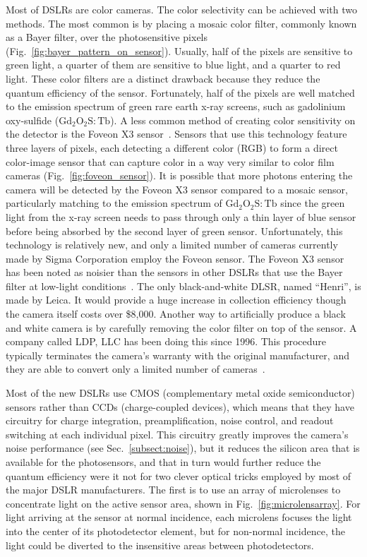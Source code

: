 Most of DSLRs are color cameras.  The color selectivity can be achieved with two methods.  The most common is by placing a mosaic color filter, commonly known as a Bayer filter, over the photosensitive pixels (Fig.~\ref{fig:bayer_pattern_on_sensor}).  Usually, half of the pixels are sensitive to green light, a quarter of them are sensitive to blue light, and a quarter to red light.  These color filters are a distinct drawback because they reduce the quantum efficiency of the sensor.  Fortunately, half of the pixels are well matched to the emission spectrum of green rare earth x-ray screens, such as gadolinium oxy-sulfide ($\mathrm{Gd_2O_2S:Tb}$).  A less common method of creating color sensitivity on the detector is the Foveon X3 sensor~\citep{foveon}.  Sensors that use this technology feature three layers of pixels, each detecting a different color (RGB) to form a direct color-image sensor that can capture color in a way very similar to color film cameras (Fig.~\ref{fig:foveon_sensor}).  It is possible that more photons entering the camera will be detected by the Foveon X3 sensor compared to a mosaic sensor, particularly matching to the emission spectrum of $\mathrm{Gd_2O_2S:Tb}$ since the green light from the x-ray screen needs to pass through only a thin layer of blue sensor before being absorbed by the second layer of green sensor.  Unfortunately, this technology is relatively new, and only a limited number of cameras currently made by Sigma Corporation employ the Foveon sensor.  The Foveon X3 sensor has been noted as noisier than the sensors in other DSLRs that use the Bayer filter at low-light conditions~\citep{sigmasd10, stevesdigicams}.  The only black-and-white DLSR, named ``Henri'', is made by Leica.  It would provide a huge increase in collection efficiency though the camera itself costs over \$8,000.  Another way to artificially produce a black and white camera is by carefully removing the color filter on top of the sensor.  A company called LDP, LLC has been doing this since 1996.  This procedure typically terminates the camera's warranty with the original manufacturer, and they are able to convert only a limited number of cameras~\citep{maxmax}.

Most of the new DSLRs use CMOS (complementary metal oxide semiconductor) sensors rather than CCDs (charge-coupled devices), which means that they have circuitry for charge integration, preamplification, noise control, and readout switching at each individual pixel. This circuitry greatly improves the camera's noise performance (see Sec.~\ref{subsect:noise}), but it reduces the silicon area that is available for the photosensors, and that in turn would further reduce the quantum efficiency were it not for two clever optical tricks employed by most of the major DSLR manufacturers. The first is to use an array of microlenses to concentrate light on the active sensor area, shown in Fig.~\ref{fig:microlensarray}. For light arriving at the sensor at normal incidence, each microlens focuses the light into the center of its photodetector element, but for non-normal incidence, the light could be diverted to the insensitive areas between photodetectors.

